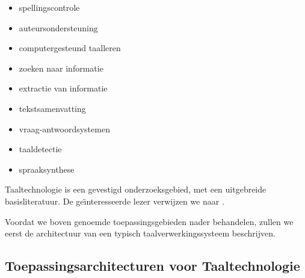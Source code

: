 \begin{multicols}{2}
\begin{itemize}
\item spellingscontrole
\item auteursondersteuning
\item computergesteund taalleren
\item zoeken naar informatie
\item extractie van informatie
\item tekstsamenvatting
\item vraag-antwoordsystemen
\item taaldetectie
\item spraaksynthese
\end{itemize}

Taaltechnologie is een gevestigd onderzoeksgebied, met een uitgebreide basisliteratuur. De ge{\"\i}nteresseerde lezer verwijzen we naar
\cite{jurafsky-martin01, manning-schuetze1, lt-world1, lt-survey1}.

Voordat we boven genoemde toepassingsgebieden nader behandelen, zullen we eerst de architectuur van een typisch taalverwerkingssysteem beschrijven.

\subsection[Toepassingsarchitecturen voor Taaltechnologie]{Toepassingsarchitecturen voor Taaltechnologie}


\end{multicols}
